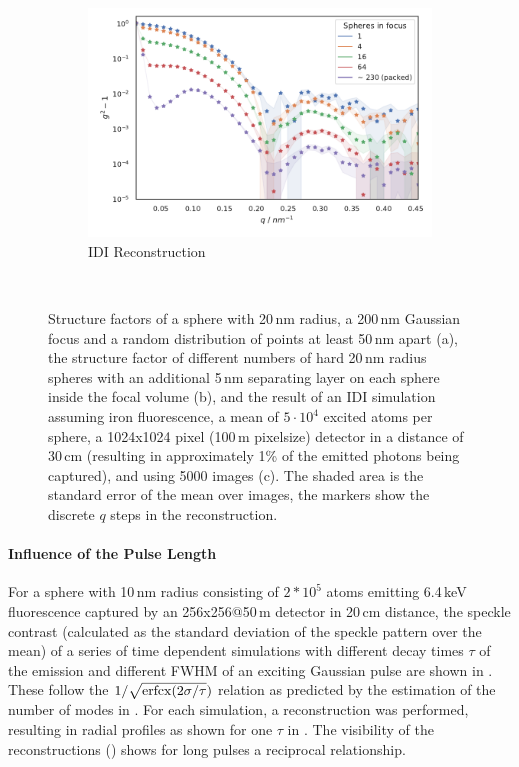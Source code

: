\begin{figure}
	\begin{subfigure}[b]{0.45\textwidth}
		\includegraphics[width=\linewidth]{images/multisphere2.pdf}
		\caption{IDI Reconstruction}
		\label{fig:multisphere2}
	\end{subfigure}
	\begin{subfigure}[b]{0.45\textwidth}
		$ $
	\end{subfigure}
\caption[Structure factors and reconstructions for multiple spherical samples]{Structure factors of a sphere with 20\,nm radius, a 200\,nm Gaussian focus and a random distribution of points at least 50\,nm apart (a), the structure factor of different numbers of hard 20\,nm radius spheres with an additional 5\,nm separating layer on each sphere inside the focal volume (b), and the result of an IDI simulation assuming iron fluorescence, a mean of $5\cdot10^4$ excited atoms per sphere, a 1024x1024 pixel (100\,\textmu m pixelsize) detector in a distance of 30\,cm (resulting in approximately 1\% of the emitted photons being captured), and using 5000 images (c). The shaded area is the standard error of the mean over images, the markers show the discrete $q$ steps in the reconstruction.}

\end{figure}


\paragraph{Influence of the Pulse Length}
For a sphere with 10\,nm radius consisting of $2*10^5$ atoms emitting 6.4\,keV fluorescence captured by an 256x256@50\,\textmu m detector in 20\,cm distance, the speckle contrast (calculated as the standard deviation of the speckle pattern over the mean) of a series of time dependent simulations with different decay times $\tau$ of the emission and different FWHM of an exciting Gaussian pulse are shown in .  These follow the $1/\sqrt{\operatorname{erfcx}(2\sigma/\tau})$ relation as predicted by the estimation of the number of modes in .  For each simulation, a reconstruction was performed, resulting in radial profiles as shown for one $\tau$ in .  The visibility of the reconstructions () shows for long pulses a reciprocal relationship.

